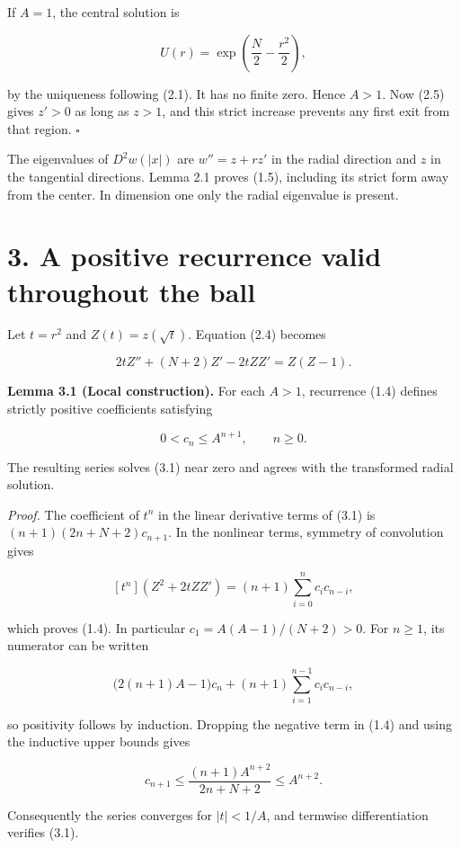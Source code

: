 \documentclass[11pt]{article}
\begin{document}
If \(A=1\), the central solution is

\[
U(r)=\exp\left(\frac N2-\frac{r^2}2\right),
\tag{2.6}
\]

by the uniqueness following (2.1). It has no finite zero. Hence \(A>1\).
Now (2.5) gives \(z'>0\) as long as \(z>1\), and this strict increase
prevents any first exit from that region. \(\square\)

The eigenvalues of \(D^2w(|x|)\) are \(w''=z+rz'\) in the radial
direction and \(z\) in the tangential directions. Lemma 2.1 proves
(1.5), including its strict form away from the center. In dimension one
only the radial eigenvalue is present.

\section{3. A positive recurrence valid throughout the
ball}\label{a-positive-recurrence-valid-throughout-the-ball}

Let \(t=r^2\) and \(Z(t)=z(\sqrt t)\). Equation (2.4) becomes

\[
2tZ''+(N+2)Z'-2tZZ'=Z(Z-1).
\tag{3.1}
\]

\textbf{Lemma 3.1 (Local construction).} For each \(A>1\), recurrence
(1.4) defines strictly positive coefficients satisfying

\[
0<c_n\leq A^{n+1},\qquad n\geq0.
\tag{3.2}
\]

The resulting series solves (3.1) near zero and agrees with the
transformed radial solution.

\emph{Proof.} The coefficient of \(t^n\) in the linear derivative terms
of (3.1) is \((n+1)(2n+N+2)c_{n+1}\). In the nonlinear terms, symmetry
of convolution gives

\[
[t^n](Z^2+2tZZ')=(n+1)\sum_{i=0}^n c_i c_{n-i},
\tag{3.3}
\]

which proves (1.4). In particular \(c_1=A(A-1)/(N+2)>0\). For
\(n\geq1\), its numerator can be written

\[
\bigl(2(n+1)A-1\bigr)c_n
+(n+1)\sum_{i=1}^{n-1}c_i c_{n-i},
\tag{3.4}
\]

so positivity follows by induction. Dropping the negative term in (1.4)
and using the inductive upper bounds gives

\[
c_{n+1}\leq\frac{(n+1)A^{n+2}}{2n+N+2}\leq A^{n+2}.
\tag{3.5}
\]

Consequently the series converges for \(|t|<1/A\), and termwise
differentiation verifies (3.1).
\end{document}
